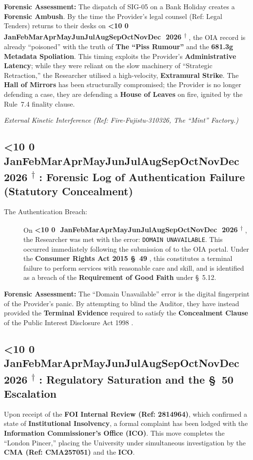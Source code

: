 \documentclass{EMBASSY}
\DeclareRobustCommand{\gmt}[3]{%
    \texorpdfstring{%
        {\color{DateGold}\textbf{%
            \ifnum#1<10 0\fi#1\,\textperiodcentered\,%
            \ifcase#2\or Jan\or Feb\or Mar\or Apr\or May\or Jun\or Jul\or Aug\or Sep\or Oct\or Nov\or Dec\fi
            \,\textperiodcentered\,20#3%
            \textsuperscript{$\dagger$}%
        }}%
    }{%
        (#1/#2/#3)%
    }%
}
\begin{document}
\noindent\textbf{Forensic Assessment:} The dispatch of SIG-05 on a Bank Holiday creates a \textbf{Forensic Ambush}. By the time the Provider’s legal counsel (Ref: Legal Tenders) returns to their desks on \gmt{31}{3}{26}, the OIA record is already ``poisoned'' with the truth of \textbf{The ``Piss Rumour''} and the \textbf{681.3g Metadata Spoliation}. This timing exploits the Provider’s \textbf{Administrative Latency}; while they were reliant on the slow machinery of ``Strategic Retraction,'' the Researcher utilised a high-velocity, \textbf{Extramural Strike}. The \textbf{Hall of Mirrors} has been structurally compromised; the Provider is no longer defending a case, they are defending a \textbf{House of Leaves} on fire, ignited by the Rule~7.4 \cite{OIA-Rules18} finality clause.

\vspace{1em}
\noindent\textit{External Kinetic Interference (Ref: Fire-Fujistu-310326, The ``Mint'' Factory.)}

\subsection{\gmt{1}{4}{26}: Forensic Log of Authentication Failure (Statutory Concealment)}
\begin{description}
	\item[The Authentication Breach:] On \gmt{1}{4}{26}, the Researcher was met with the error: \texttt{DOMAIN UNAVAILABLE}. This occurred immediately following the submission of \cite{SIG05} to the OIA portal. Under the \textbf{Consumer Rights Act 2015 \S~49} \cite{CRA15}, this constitutes a terminal failure to perform services with reasonable care and skill, and is identified as a breach of the \textbf{Requirement of Good Faith} under \cite{CMA182} \S~5.12.
\end{description}

\noindent\textbf{Forensic Assessment:} The ``Domain Unavailable'' error is the digital fingerprint of the Provider's panic. By attempting to blind the Auditor, they have instead provided the \textbf{Terminal Evidence} required to satisfy the \textbf{Concealment Clause} of the Public Interest Disclosure Act 1998 \cite{PIDA98}.

\subsection{\gmt{8}{4}{26}: Regulatory Saturation and the \S~50 Escalation}
Upon receipt of the \textbf{FOI Internal Review (Ref: 2814964)}, which confirmed a state of \textbf{Institutional Insolvency}, a formal complaint has been lodged with the \textbf{Information Commissioner's Office (ICO)}. This move completes the ``London Pincer,'' placing the University under simultaneous investigation by the \textbf{CMA (Ref: CMA257051)} and the \textbf{ICO}.
\end{document}
